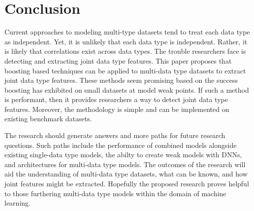 \chapter{Conclusion}

Current approaches to modeling multi-type datasets tend to treat each data type as independent.  Yet, it is unlikely that each data type is independent.  Rather, it is likely that correlations exist across data types.  The trouble researchers face is detecting and extracting joint data type features.  This paper proposes that boosting based techniques can be applied to multi-data type datasets to extract joint data type features.  These methods seem promising based on the success boosting has exhibited on small datasets at model weak points.  If such a method is performant, then it provides researchers a way to detect joint data type features.  Moreover, the methodology is simple and can be implemented on existing benchmark datasets.

The research should generate answers and more paths for future research questions.  Such paths include the performance of combined models alongside existing single-data type models, the abilty to create weak models with DNNs, and architectures for multi-data type models.  The outcomes of the research will aid the understanding of multi-data type datasets, what can be known, and how joint features might be extracted.  Hopefully the proposed research proves helpful to those furthering multi-data type models within the domain of machine learning.




